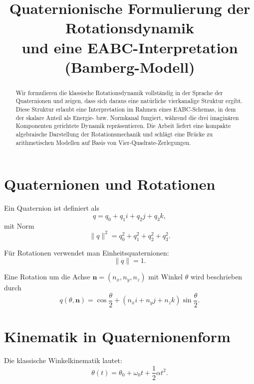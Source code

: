 \documentclass[11pt]{article}
\title{Quaternionische Formulierung der Rotationsdynamik \\ 
	und eine EABC-Interpretation (Bamberg-Modell)}
\author{}
\date{}
\begin{document}
	
	\maketitle
	
	\begin{abstract}
		Wir formulieren die klassische Rotationsdynamik vollständig in der Sprache der Quaternionen und zeigen, dass sich daraus eine natürliche vierkanalige Struktur ergibt. Diese Struktur erlaubt eine Interpretation im Rahmen eines EABC-Schemas, in dem der skalare Anteil als Energie- bzw. Normkanal fungiert, während die drei imaginären Komponenten gerichtete Dynamik repräsentieren. Die Arbeit liefert eine kompakte algebraische Darstellung der Rotationsmechanik und schlägt eine Brücke zu arithmetischen Modellen auf Basis von Vier-Quadrate-Zerlegungen.
	\end{abstract}
	
	\section{Quaternionen und Rotationen}
	
	Ein Quaternion ist definiert als
	\begin{equation}
		q = q_0 + q_1 i + q_2 j + q_3 k,
	\end{equation}
	mit Norm
	\begin{equation}
		\|q\|^2 = q_0^2 + q_1^2 + q_2^2 + q_3^2.
	\end{equation}
	
	Für Rotationen verwendet man Einheitsquaternionen:
	\begin{equation}
		\|q\| = 1.
	\end{equation}
	
	Eine Rotation um die Achse $\mathbf n = (n_x,n_y,n_z)$ mit Winkel $\theta$ wird beschrieben durch
	\begin{equation}
		q(\theta,\mathbf n)
		=
		\cos\frac{\theta}{2}
		+
		(n_x i+n_y j+n_z k)\sin\frac{\theta}{2}.
	\end{equation}
	
	\section{Kinematik in Quaternionenform}
	
	Die klassische Winkelkinematik lautet:
	\begin{equation}
		\theta(t) = \theta_0 + \omega_0 t + \frac12 \alpha t^2.
	\end{equation}
	
\end{document}
